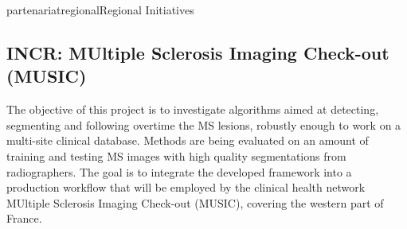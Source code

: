 \documentclass{ra2018}
\begin{document}

\begin{module}{partenariat}{regional}{Regional Initiatives}

\subsection{INCR: MUltiple Sclerosis Imaging Check-out (MUSIC)}
    \begin{participants}
    \end{participants}
The objective of this project is to investigate algorithms aimed at detecting, segmenting and following overtime the MS lesions, robustly enough to work on a multi-site clinical database. Methods are being evaluated on an amount of training and testing MS images with high quality segmentations from radiographers.
The goal is to integrate the developed framework into a production workflow that will be employed by the clinical health network MUltiple Sclerosis Imaging Check-out (MUSIC), covering the western part of France.

\end{module}
\end{document}
